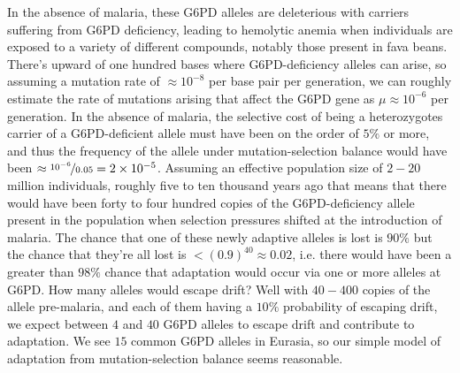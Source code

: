 {In the absence of malaria, these G6PD alleles are deleterious with
carriers suffering from G6PD deficiency,
leading to hemolytic anemia when individuals are exposed to a variety of different compounds, notably those present in fava beans.
There's upward of one hundred bases where G6PD-deficiency alleles can arise, so assuming a mutation rate of $\approx 10^{-8}$ per base pair per
generation, we can roughly estimate the rate of mutations arising that affect the G6PD gene as $\mu \approx
10^{-6}$ per generation. In the absence of malaria, the selective cost of being a heterozygotes carrier of a G6PD-deficient allele must have been on the order of
$5\%$ or more, and thus the frequency of the allele under
mutation-selection balance would have been $\approx \nicefrac{10^{-6}}{0.05} =2
\times 10^{-5}$.   Assuming an effective population size of  $2-20$ million
individuals, roughly five to ten thousand years ago that means that
there would have been forty to four hundred copies of the G6PD-deficiency
allele present in the population when selection pressures shifted at the introduction of malaria. The
chance that one of these newly adaptive alleles is lost
is $90\%$ but the chance that they're all lost is $<(0.9)^{40}\approx 0.02$, i.e. there would have been a
greater than $98\%$ chance that adaptation would occur via one or more
alleles at G6PD. How many alleles would escape drift? Well with $40 - 400$
copies of the allele pre-malaria, and each of them having a $10\%$
probability of escaping drift, we expect between $4$ and $40$ G6PD
alleles to escape drift and contribute to adaptation. We see $15$ common G6PD
alleles in Eurasia, so our simple model of adaptation from
mutation-selection balance seems reasonable.  

}

